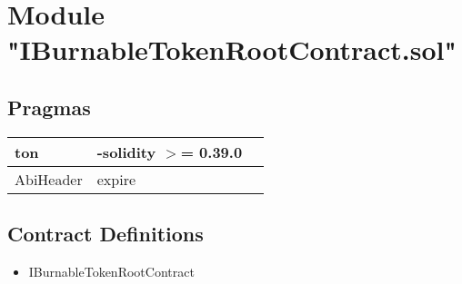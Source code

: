 
\section{Module "IBurnableTokenRootContract.sol"}


\subsection{Pragmas}


\noindent\begin{tabular}{|l|l|p{5cm}|}\hline
ton & -solidity $>$= 0.39.0 &\\\hline
AbiHeader &  expire &\\\hline
\end{tabular}


\subsection{Contract Definitions}

\begin{itemize}
\item IBurnableTokenRootContract
\end{itemize}
